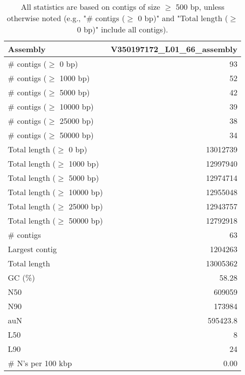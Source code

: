 \documentclass[12pt,a4paper]{article}
\begin{document}
\begin{table}[ht]
\begin{center}
\caption{All statistics are based on contigs of size $\geq$ 500 bp, unless otherwise noted (e.g., "\# contigs ($\geq$ 0 bp)" and "Total length ($\geq$ 0 bp)" include all contigs).}
\begin{tabular}{|l*{1}{|r}|}
\hline
Assembly & V350197172\_L01\_66\_assembly \\ \hline
\# contigs ($\geq$ 0 bp) & 93 \\ \hline
\# contigs ($\geq$ 1000 bp) & 52 \\ \hline
\# contigs ($\geq$ 5000 bp) & 42 \\ \hline
\# contigs ($\geq$ 10000 bp) & 39 \\ \hline
\# contigs ($\geq$ 25000 bp) & 38 \\ \hline
\# contigs ($\geq$ 50000 bp) & 34 \\ \hline
Total length ($\geq$ 0 bp) & 13012739 \\ \hline
Total length ($\geq$ 1000 bp) & 12997940 \\ \hline
Total length ($\geq$ 5000 bp) & 12974714 \\ \hline
Total length ($\geq$ 10000 bp) & 12955048 \\ \hline
Total length ($\geq$ 25000 bp) & 12943757 \\ \hline
Total length ($\geq$ 50000 bp) & 12792918 \\ \hline
\# contigs & 63 \\ \hline
Largest contig & 1204263 \\ \hline
Total length & 13005362 \\ \hline
GC (\%) & 58.28 \\ \hline
N50 & 609059 \\ \hline
N90 & 173984 \\ \hline
auN & 595423.8 \\ \hline
L50 & 8 \\ \hline
L90 & 24 \\ \hline
\# N's per 100 kbp & 0.00 \\ \hline
\end{tabular}
\end{center}
\end{table}
\end{document}

